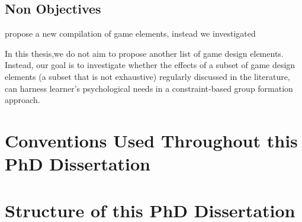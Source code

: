 \subsection{Non Objectives}

propose a new compilation of game elements, instead we investigated 

In this thesis,we do not aim to propose another list of game design elements. Instead, our goal is to investigate whether the effects of a subset of game design elements (a subset that is not exhaustive) regularly discussed in the literature, can harness learner's psychological needs in a constraint-based group formation approach.



\section{Conventions Used Throughout this PhD Dissertation}


\section{Structure of this PhD Dissertation}








